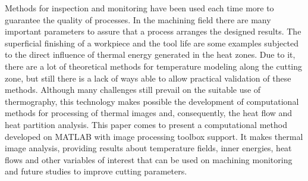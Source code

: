 	Methods for inspection and monitoring have been used each time more to guarantee the quality of processes. In the machining field there are many important parameters to assure that a process arranges the designed results. The superficial finishing of a workpiece and the tool life are some examples subjected to the direct influence of thermal energy generated in the heat zones. Due to it, there are a lot of theoretical methods for temperature modeling along the cutting zone, but still there is a lack of ways able to allow practical validation of these methods. Although many challenges still prevail on the suitable use of thermography, this technology makes possible the development of computational methods for processing of thermal images and, consequently, the heat flow and heat partition analysis.
	This paper comes to present a computational method developed on MATLAB with image processing toolbox support. It makes thermal image analysis, providing results about temperature fields, inner energies, heat flows and other variables of interest that can be used on machining monitoring and future studies to improve cutting parameters.